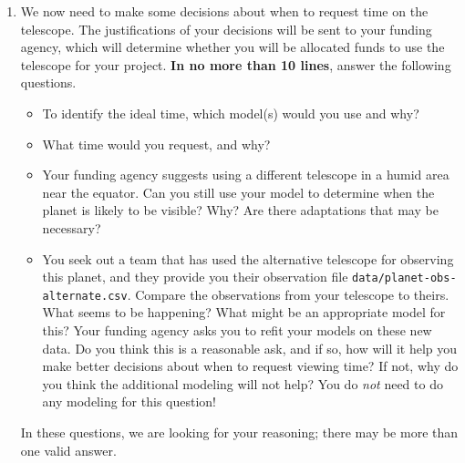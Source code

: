 \documentclass[submit]{../harvardml}
\begin{document}
\begin{framed}
\begin{enumerate}
    \item We now need to make some decisions about when to request time on
          the telescope.  The justifications of your decisions will be sent to
          your funding agency, which will determine whether you will be
          allocated funds to use the telescope for your project. \textbf{In no more than 10 lines}, answer the following questions.
          \begin{itemize}
            \item To identify the ideal time, which model(s) would you use and why?
            \item What time would you request, and why?
            \item Your funding agency suggests using a different telescope in a
                  humid area near the equator. Can you still use your model to
                  determine when the planet is likely to be visible?  Why? Are there
                  adaptations that may be necessary?
            \item You seek out a team that has used the alternative telescope
                  for observing this planet, and they provide you their observation
                  file \verb|data/planet-obs-alternate.csv|.
                  Compare the observations from your telescope to theirs.  What
                  seems to be happening?  What might be an appropriate model for
                  this? Your funding agency asks you to refit your models on these
                  new data.  Do you think this is a reasonable ask, and if so, how
                  will it help you make better decisions about when to request
                  viewing time?  If not, why do you think the additional modeling
                  will not help? You do \emph{not} need to do any modeling for this
                  question!

          \end{itemize}
          In these questions, we are looking for your reasoning; there may be
          more than one valid answer.

  \end{enumerate}
\end{framed}

\newpage
\end{document}
